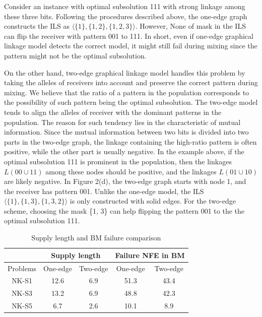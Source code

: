 \documentclass{sig-alternate-05-2015}
\begin{document}
Consider an instance with  optimal subsolution 111 with  strong  linkage among these three bits. Following the procedures described above, the one-edge graph constructs the ILS as $\langle\{1\}, \{1, 2\}, \{1, 2, 3\}\rangle$. However, None of mask in the ILS can flip the receiver with pattern 001 to 111. In short, even if one-edge graphical linkage model detects the correct model, it might still fail during mixing since the pattern might not be the optimal subsolution.


On the other hand, two-edge graphical linkage model  handles this problem by taking the alleles of receivers into account and preserve the correct pattern during mixing. We believe that the ratio of a pattern in the population corresponds to the possibility of such pattern being the optimal subsolution. The two-edge model tends to align the alleles of receiver  with the dominant patterns in the population. The reason for such tendency lies in the characteristic of mutual information. Since the mutual information between two bits is divided into two parts in the two-edge graph,  the  linkage containing the high-ratio pattern  is often positive, while the other part is usually negative.  In the example above, if the optimal subsolution 111 is prominent in the population, then the linkages $L(00\cup11)$ among these nodes should be positive, and the linkages $L(01\cup10)$ are likely negative.  In Figure 2(d), the two-edge graph starts with node 1, and the receiver has pattern  001. Unlike the one-edge model, the ILS  $\langle\{1\}, \{1, 3\}, \{1, 3, 2\}\rangle$ is only constructed with solid edges. For the two-edge scheme, choosing the mask \{1, 3\} can help flipping the pattern 001 to the the optimal subsolution 111.    


\begin{table}[ht]
\begin{tabular}{|c|c|c|c|c|}
\hline
 &
\multicolumn{2}{c|}{Supply length} &
\multicolumn{2}{c|}{Failure NFE in BM} \\
\hline
Problems  & One-edge & Two-edge & One-edge & Two-edge \\\hline
NK-S1 & 12.6 & 6.9  &51.3 & 43.4 \\\hline
NK-S3 & 13.2 & 6.9  &48.8 & 42.3 \\\hline
NK-S5 & 6.7 &2.6  & 10.1 & 8.9 \\\hline

\end{tabular}
\caption{Supply length and BM failure comparison}
\end{table}
\end{document}
